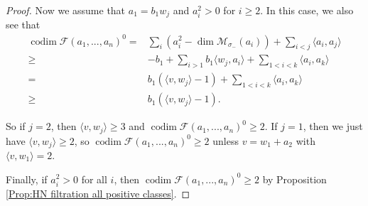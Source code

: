 \documentclass[leqno,11pt]{amsart}
\def\codim{\mathop{\mathrm{codim}}\nolimits}
\def\dim{\mathop{\mathrm{dim}}\nolimits}
\theoremstyle{definition}
\def\FF{\ensuremath{\mathcal F}}
\def\MM{\ensuremath{\mathcal M}}
\begin{document}
\begin{proof}
Now we assume that $a_1=b_1 w_j$ and $a_i^2>0$ for $i \geq 2$.
In this case, we also see that
\begin{equation}
\begin{split}
\codim\FF(a_1,...,a_n)^0=&\sum_i (a_i^2-\dim \MM_{\sigma_-}(a_i))+\sum_{i<j}\langle a_i,a_j \rangle\\
\geq&-b_1+\sum_{i>1}b_1\langle w_j,a_i\rangle+\sum_{1<i<k}\langle a_i,a_k\rangle\\
=&b_1(\langle v,w_j\rangle-1)+\sum_{1<i<k}\langle a_i,a_k\rangle\\
\geq&b_1(\langle v,w_j\rangle-1).
\end{split}
\end{equation}

So if $j=2$, then $\langle v,w_j\rangle\geq 3$ and $\codim\FF(a_1,...,a_n)^0\geq 2$.  If $j=1$, then we just have $\langle v,w_j\rangle\geq 2$, so $\codim\FF(a_1,...,a_n)^0\geq 2$ unless $v=w_1+a_2$ with $\langle v,w_1\rangle=2$.

Finally, if $a_i^2>0$ for all $i$, then $\codim\FF(a_1,...,a_n)^0\geq 2$ by Proposition \ref{Prop:HN filtration all positive classes}.
\end{proof}
\end{document}
